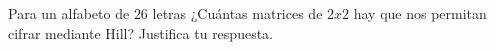 Para un alfabeto de $26$ letras ¿Cuántas matrices de $2x2$ hay que nos permitan cifrar mediante Hill? Justifica tu respuesta.